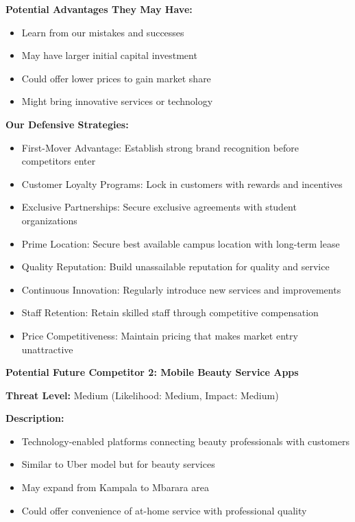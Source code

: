 \documentclass[a4paper,12pt]{article}
\begin{document}
\textbf{Potential Advantages They May Have:}
\begin{itemize}[leftmargin=2em]
    \item Learn from our mistakes and successes
    \item May have larger initial capital investment
    \item Could offer lower prices to gain market share
    \item Might bring innovative services or technology
\end{itemize}

\textbf{Our Defensive Strategies:}
\begin{itemize}[leftmargin=2em]
    \item First-Mover Advantage: Establish strong brand recognition before competitors enter
    \item Customer Loyalty Programs: Lock in customers with rewards and incentives
    \item Exclusive Partnerships: Secure exclusive agreements with student organizations
    \item Prime Location: Secure best available campus location with long-term lease
    \item Quality Reputation: Build unassailable reputation for quality and service
    \item Continuous Innovation: Regularly introduce new services and improvements
    \item Staff Retention: Retain skilled staff through competitive compensation
    \item Price Competitiveness: Maintain pricing that makes market entry unattractive
\end{itemize}

\vspace{1em}

\textbf{Potential Future Competitor 2: Mobile Beauty Service Apps}

\textbf{Threat Level:} Medium (Likelihood: Medium, Impact: Medium)

\textbf{Description:}
\begin{itemize}[leftmargin=2em]
    \item Technology-enabled platforms connecting beauty professionals with customers
    \item Similar to Uber model but for beauty services
    \item May expand from Kampala to Mbarara area
    \item Could offer convenience of at-home service with professional quality
\end{itemize}
\end{document}

